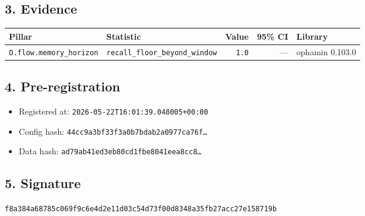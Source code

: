 \documentclass{article}
\begin{document}
\subsection*{3. Evidence}
\begin{tabular}{llrrl}\toprule
\textbf{Pillar} & \textbf{Statistic} & \textbf{Value} & \textbf{95\% CI} & \textbf{Library} \\\midrule
\texttt{O.flow.memory\_horizon} & \texttt{recall\_floor\_beyond\_window} & \texttt{1.0} & --- & ophamin 0.103.0 \\
\bottomrule\end{tabular}
\subsection*{4. Pre-registration}
\begin{itemize}
\item Registered at: \texttt{2026-05-22T16:01:39.048005+00:00}
\item Config hash: \texttt{44cc9a3bf33f3a0b7bdab2a0977ca76f\dots}
\item Data hash: \texttt{ad79ab41ed3eb80cd1fbe8041eea8cc8\dots}
\end{itemize}
\subsection*{5. Signature}
\texttt{f8a384a68785c069f9c6e4d2e11d03c54d73f00d8348a35fb27acc27e158719b}\\
\end{document}
